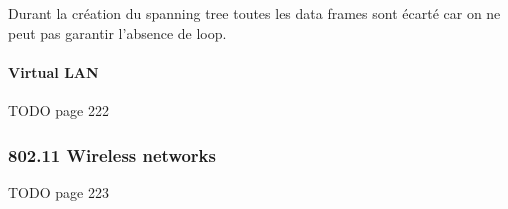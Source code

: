 Durant la création du spanning tree toutes les data frames sont écarté
car on ne peut pas garantir l'absence de loop.


\paragraph{Virtual LAN}

TODO page 222

\subsubsection{802.11 Wireless networks}

TODO page 223

\biblio


